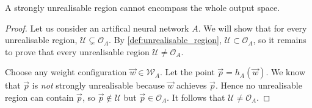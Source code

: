 \begin{lemma}
    A strongly unrealisable region cannot encompass the whole output space.
\end{lemma}
\begin{proof}
    Let us consider an artifical neural network $A$. 
    We will show that for every unrealisable region, $\mathcal{U} \subsetneq \mathcal{O}_A$.
    By \ref{def:unrealisable_region}, $\mathcal{U} \subset \mathcal{O}_A$, so it remains to prove that every unrealisable region $\mathcal{U} \neq \mathcal{O}_A$.

    Choose any weight configuration $\vec{w} \in \mathcal{W}_A$. 
    Let the point $\vec{p}=h_A(\vec{w})$. 
    We know that $\vec{p}$ is \textit{not} strongly unrealisable because $\vec{w}$ achieves $\vec{p}$. 
    Hence no unrealisable region can contain $\vec{p}$, so $\vec{p} \notin \mathcal{U}$ but $\vec{p} \in \mathcal{O}_A$. 
    It follows that $\mathcal{U} \neq \mathcal{O}_A$.
\end{proof}

